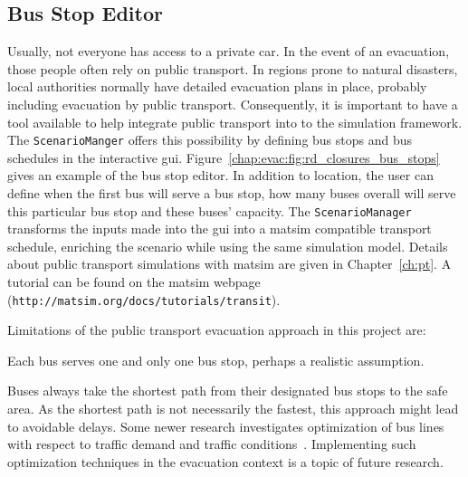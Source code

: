 \subsection{Bus Stop Editor}
Usually, not everyone has access to a private car. In the event of an evacuation, those people often rely on public transport. In regions prone to natural disasters, local authorities normally have detailed evacuation plans in place, probably including evacuation by public transport. Consequently, it is important to have a tool available to help  integrate public transport into to the simulation framework. The \lstinline|ScenarioManger| offers this possibility by defining bus stops and bus schedules in the interactive \gls{gui}. Figure~\ref{chap:evac:fig:rd_closures_bus_stops} gives an example of the bus stop editor. In addition to location, the user can define when the first bus will serve a bus stop, how many buses overall will serve this particular bus stop and these buses' capacity. 
The \lstinline|ScenarioManager| transforms the inputs made into the \gls{gui} into a \gls{matsim} compatible transport schedule, enriching the scenario while using the same simulation model. Details about public transport simulations with \gls{matsim} are given in Chapter~\ref{ch:pt}. A tutorial can be found on the \gls{matsim} webpage (\lstinline|http://matsim.org/docs/tutorials/transit|).

Limitations of the public transport evacuation approach in this project are:
\begin{compactitem}
\item Each bus serves one and only one bus stop, perhaps a realistic assumption.
\item Buses always take the shortest path from their designated bus stops to the safe area. As the shortest path is not necessarily the fastest, this approach might lead to avoidable delays. Some newer research investigates optimization of bus lines with respect to traffic demand and traffic conditions~\citep{Neumann_PhDThesis_2014}. Implementing such optimization techniques in the evacuation context is a topic of future research.
\end{compactitem}

